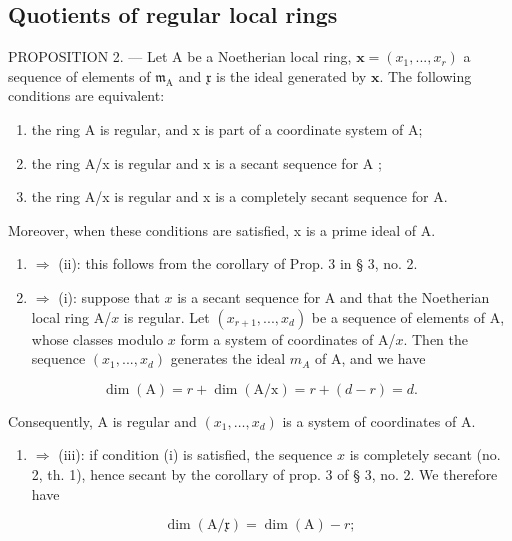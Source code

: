 \subsection{Quotients of regular local rings}

PROPOSITION 2. --- Let A be a Noetherian local ring, \(\boldsymbol{x} = (x_1, ..., x_r)\) a sequence of elements of \(\mathfrak{m}_{\mathrm{A}}\) and \(\mathfrak{x}\) is the ideal generated by \(\boldsymbol{x}\). The following conditions are equivalent:

\begin{enumerate}
\def\labelenumi{(\roman{enumi})}
\item
  the ring A is regular, and x is part of a coordinate system of A;
\item
  the ring A/x is regular and x is a secant sequence for A ;
\item
  the ring A/x is regular and x is a completely secant sequence for A.
\end{enumerate}

Moreover, when these conditions are satisfied, x is a prime ideal of A.

\begin{enumerate}
\def\labelenumi{(\roman{enumi})}
\setcounter{enumi}{2}
\item
  \(\Rightarrow\) (ii): this follows from the corollary of Prop. 3 in § 3, no. 2.
\item
  \(\Rightarrow\) (i): suppose that \(x\) is a secant sequence for A and that the Noetherian local ring A/\(x\) is regular. Let \((x_{r+1}, ..., x_d)\) be a sequence of elements of A, whose classes modulo \(x\) form a system of coordinates of A/\(x\). Then the sequence \((x_1, ..., x_d)\) generates the ideal \(m_A\) of A, and we have
\end{enumerate}

\[
\dim (\mathrm{A}) = r + \dim (\mathrm{A} / \mathrm{x}) = r + (d - r) = d.
\]

Consequently, A is regular and \((x_{1},\ldots,x_{d})\) is a system of coordinates of A.

\begin{enumerate}
\def\labelenumi{(\roman{enumi})}
\tightlist
\item
  \(\Rightarrow\) (iii): if condition (i) is satisfied, the sequence \(x\) is completely secant (no. 2, th. 1), hence secant by the corollary of prop. 3 of § 3, no. 2. We therefore have
\end{enumerate}

\[
\dim (\mathrm{A} / \mathfrak {x}) = \dim (\mathrm{A}) - r;\tag{3}
\]

